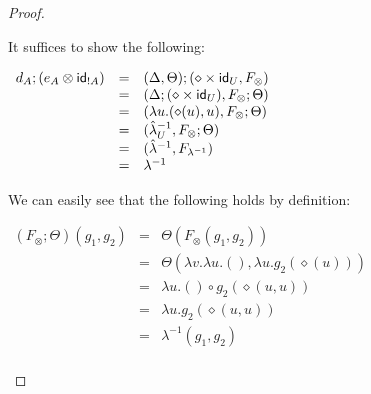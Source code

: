 \begin{proof}
\begin{report}
\begin{itemize}
    It suffices to show the following:
    \begin{center}
      \begin{math}
        \begin{array}{lll}
          d_A;(e_A \otimes \mathsf{id}_{!A})
          & = & (\Delta,\Theta);(\diamond \times \mathsf{id}_U,F_\otimes)\\
          & = & (\Delta;(\diamond \times \mathsf{id}_U),F_\otimes;\Theta)\\
          & = & (\lambda u.(\diamond(u),u),F_\otimes;\Theta)\\
          & = & (\hat{\lambda}^{-1}_U,F_\otimes;\Theta)\\
          & = & (\hat{\lambda}^{-1},F_{\lambda^{-1}})\\
          & = & \lambda^{-1}\\
        \end{array}
      \end{math}
    \end{center}
    We can easily see that the following holds by definition:
    \begin{center}
      \begin{math}
        \begin{array}{lll}
          (F_\otimes;\Theta)(g_1,g_2)
          & = & \Theta(F_\otimes(g_1,g_2))\\
          & = & \Theta(\lambda v.\lambda u.(),\lambda u.g_2(\diamond(u)))\\
          & = & \lambda u.() \circ g_2(\diamond(u,u))\\
          & = & \lambda u.g_2(\diamond(u,u))\\
          & = & \lambda^{-1}(g_1,g_2)\\
        \end{array}
      \end{math}
    \end{center}


\end{itemize}
\end{report}
\end{proof}
